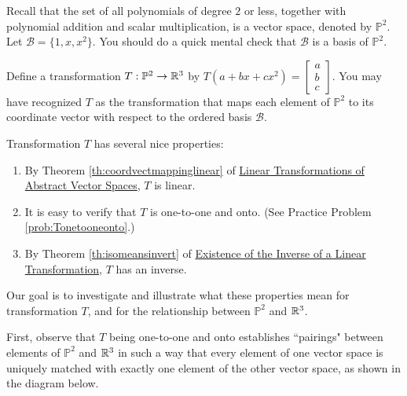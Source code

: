 \documentclass{ximera}
\begin{document}
\begin{exploration}\label{init:isomorph}
Recall that the set of all polynomials of degree $2$ or less, together with polynomial addition and scalar multiplication, is a vector space, denoted by $\mathbb{P}^2$.  Let $\mathcal{B}=\{1, x, x^2\}$. You should do a quick mental check that $\mathcal{B}$ is a basis of $\mathbb{P}^2$.

Define a transformation $T:\mathbb{P}^2\rightarrow \mathbb{R}^3$ by
$T(a+bx+cx^2)=\begin{bmatrix}a\\b\\c\end{bmatrix}$.  You may have recognized $T$ as the transformation that maps each element of $\mathbb{P}^2$ to its coordinate vector with respect to the ordered basis $\mathcal{B}$.  

Transformation $T$ has several nice properties:
  \begin{enumerate}
      \item By Theorem \ref{th:coordvectmappinglinear} of \href{https://ximera.osu.edu/linearalgebradzv3/LinearAlgebraInteractiveIntro/LTR-0022/main}{Linear Transformations of Abstract Vector Spaces}, $T$ is linear.
      \item It is easy to verify that $T$ is one-to-one and onto. (See Practice Problem \ref{prob:Tonetooneonto}.)
      \item By Theorem \ref{th:isomeansinvert} of \href{https://ximera.osu.edu/linearalgebradzv3/LinearAlgebraInteractiveIntro/LTR-0035/main}{Existence of the Inverse of a Linear Transformation}, $T$ has an inverse.
  \end{enumerate}
  
  Our goal is to investigate and illustrate what these properties mean for transformation $T$, and for the relationship between $\mathbb{P}^2$ and $\mathbb{R}^3$.  
  
  First, observe that $T$ being one-to-one and onto establishes ``pairings" between elements of $\mathbb{P}^2$ and $\mathbb{R}^3$ in such a way that every element of one vector space is uniquely matched with exactly one element of the other vector space, as shown in the diagram below.
  
 \begin{center}
\end{center}
\end{exploration}
\end{document}
